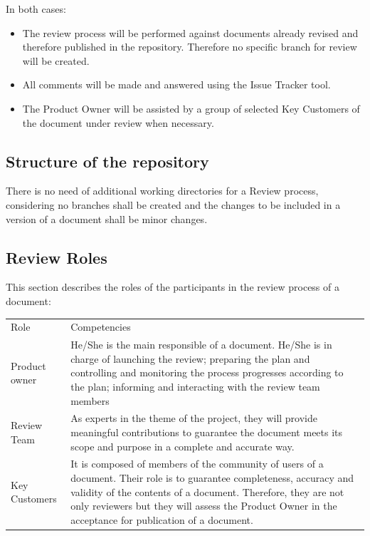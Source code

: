 \documentclass{template/openetcs_article}
\begin{document}
In both cases:
\begin{itemize}
\item The review process will be performed against documents already revised and therefore published in the repository. Therefore no specific branch for review will be created.
\item All comments will be made and answered using the Issue Tracker tool.
\item The Product Owner will be assisted by a group of selected Key Customers of the document under review when necessary.
\end{itemize}

\subsection{Structure of the repository}
 
There is no need of additional working directories for a Review process, considering no branches shall be created and the changes to be included in a version of a document shall be minor changes.

\subsection{Review Roles}

This section describes the roles of the participants in the review process of a document:

\begin{flushleft}
\begin{tabular}{|m{3cm}|m{11cm}|}
\hline
\rowcolor{myblue}
\multicolumn{2}{|c|}{Roles} \\\hline
\rowcolor{lightgray}
Role &
Competencies \\\hline
Product owner &
He/She is the main responsible of a document. He/She is in charge of launching the review; preparing the plan and controlling and monitoring the process progresses according to the plan; informing and interacting with the review team members \\\hline
Review Team &
As experts in the theme of the project, they will provide meaningful contributions to guarantee the document meets its scope and purpose in a complete and accurate way.\\\hline
Key Customers  &
It is composed of members of the community of users of a document. Their role is to guarantee completeness, accuracy and validity of the contents of a document. Therefore, they are not only reviewers but they will assess the Product Owner in the acceptance for publication of a document. \\\hline
\end{tabular}
\end{flushleft}
\end{document}
